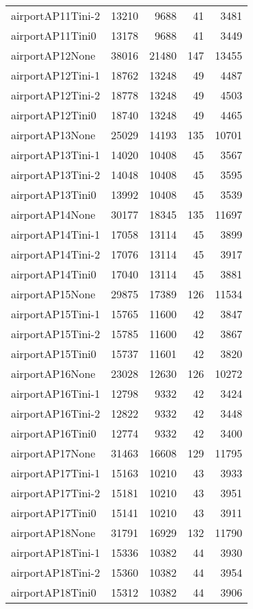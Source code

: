 \begin{longtable}{lrrrr}
airportAP11Tini-2 & 13210 & 9688 & 41 & 3481 \\
airportAP11Tini0 & 13178 & 9688 & 41 & 3449 \\
airportAP12None & 38016 & 21480 & 147 & 13455 \\
airportAP12Tini-1 & 18762 & 13248 & 49 & 4487 \\
airportAP12Tini-2 & 18778 & 13248 & 49 & 4503 \\
airportAP12Tini0 & 18740 & 13248 & 49 & 4465 \\
airportAP13None & 25029 & 14193 & 135 & 10701 \\
airportAP13Tini-1 & 14020 & 10408 & 45 & 3567 \\
airportAP13Tini-2 & 14048 & 10408 & 45 & 3595 \\
airportAP13Tini0 & 13992 & 10408 & 45 & 3539 \\
airportAP14None & 30177 & 18345 & 135 & 11697 \\
airportAP14Tini-1 & 17058 & 13114 & 45 & 3899 \\
airportAP14Tini-2 & 17076 & 13114 & 45 & 3917 \\
airportAP14Tini0 & 17040 & 13114 & 45 & 3881 \\
airportAP15None & 29875 & 17389 & 126 & 11534 \\
airportAP15Tini-1 & 15765 & 11600 & 42 & 3847 \\
airportAP15Tini-2 & 15785 & 11600 & 42 & 3867 \\
airportAP15Tini0 & 15737 & 11601 & 42 & 3820 \\
airportAP16None & 23028 & 12630 & 126 & 10272 \\
airportAP16Tini-1 & 12798 & 9332 & 42 & 3424 \\
airportAP16Tini-2 & 12822 & 9332 & 42 & 3448 \\
airportAP16Tini0 & 12774 & 9332 & 42 & 3400 \\
airportAP17None & 31463 & 16608 & 129 & 11795 \\
airportAP17Tini-1 & 15163 & 10210 & 43 & 3933 \\
airportAP17Tini-2 & 15181 & 10210 & 43 & 3951 \\
airportAP17Tini0 & 15141 & 10210 & 43 & 3911 \\
airportAP18None & 31791 & 16929 & 132 & 11790 \\
airportAP18Tini-1 & 15336 & 10382 & 44 & 3930 \\
airportAP18Tini-2 & 15360 & 10382 & 44 & 3954 \\
airportAP18Tini0 & 15312 & 10382 & 44 & 3906 \\

\end{longtable}
